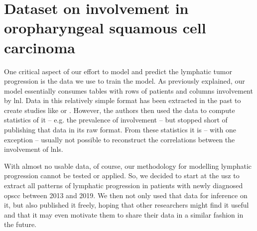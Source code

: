\documentclass[\relativeRoot/main.tex]{subfiles}
\begin{document}
\chapter[Dataset on involvement in OPSCC]{Dataset on involvement in oropharyngeal squamous cell carcinoma}
\label{chap:dataset}



One critical aspect of our effort to model and predict the lymphatic tumor progression is the data we use to train the model. As previously explained, our model essentially consumes tables with rows of patients and columns involvement by \gls{lnl}. Data in this relatively simple format has been extracted in the past to create studies like \cite{candela_patterns_1990} or \cite{shah_patterns_1990}. However, the authors then used the data to compute statistics of it -- e.g. the prevalence of involvement -- but stopped short of publishing that data in its raw format. From these statistics it is -- with one exception \cite{sanguineti_defining_2009} -- usually not possible to reconstruct the correlations between the involvement of \glspl{lnl}.

With almost no usable data, of course, our methodology for modelling lymphatic progression cannot be tested or applied. So, we decided to start at the \gls{usz} to extract all patterns of lymphatic progression in patients with newly diagnosed \gls{opscc} between 2013 and 2019. We then not only used that data for inference on it, but also published it freely, hoping that other researchers might find it useful and that it may even motivate them to share their data in a similar fashion in the future.






\end{document}
